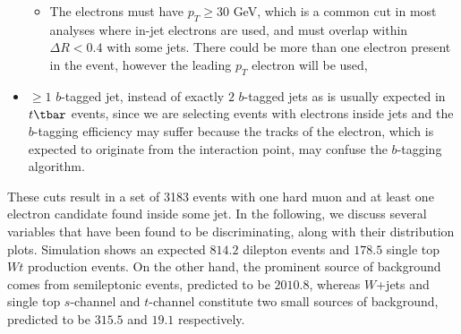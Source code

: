 \begin{itemize}
\begin{itemize}
		      \item The electrons must have $p_T \geq 30$ GeV, which is a common cut in most
		            analyses where in-jet electrons are used, and must overlap within $\Delta R <
			            0.4$ with some jets. There could be more than one electron present in the
		            event, however the leading $p_T$ electron will be used,

	      \end{itemize}

	\item $\geq 1$ $b$-tagged jet, instead of exactly $2$ $b$-tagged jets as is
	      usually expected in $t\tbar$ events, since we are selecting events with
	      electrons inside jets and the $b$-tagging efficiency may suffer because the
	      tracks of the electron, which is expected to originate from the interaction
	      point, may confuse the $b$-tagging algorithm.

\end{itemize}

These cuts result in a set of 3183 events with one hard muon and at least one
electron candidate found inside some jet. In the following, we discuss several
variables that have been found to be discriminating, along with their
distribution plots. Simulation shows an expected $814.2$ dilepton events and
$178.5$ single top $Wt$ production events. On the other hand, the prominent
source of background comes from semileptonic events, predicted to be $2010.8$,
whereas $W$+jets and single top $s$-channel and $t$-channel constitute two
small sources of background, predicted to be $315.5$ and $19.1$ respectively.

